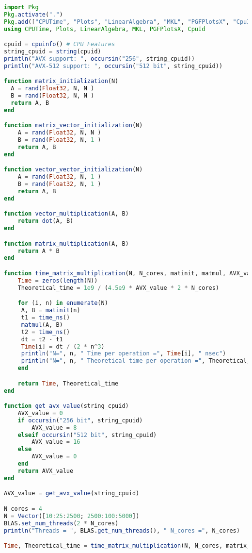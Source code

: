 \begin{lstlisting}[language=Julia]
import Pkg
Pkg.activate(".")
Pkg.add(["CPUTime", "Plots", "LinearAlgebra", "MKL", "PGFPlotsX", "CpuId"])
using CPUTime, Plots, LinearAlgebra, MKL, PGFPlotsX, CpuId

cpuid = cpuinfo() # CPU Features
string_cpuid = string(cpuid)
println("AVX support: ", occursin("256", string_cpuid))
println("AVX-512 support: ", occursin("512 bit", string_cpuid))

function matrix_initialization(N) 
  A = rand(Float32, N, N )
  B = rand(Float32, N, N )
  return A, B 
end 

function matrix_vector_initialization(N)
    A = rand(Float32, N, N )
    B = rand(Float32, N, 1 )
    return A, B 
end 

function vector_vector_initialization(N)
    A = rand(Float32, N, 1 )
    B = rand(Float32, N, 1 )
    return A, B 
end 

function vector_multiplication(A, B)
    return dot(A, B)  
end

function matrix_multiplication(A, B)
    return A * B  
end

function time_matrix_multiplication(N, N_cores, matinit, matmul, AVX_value)
    Time = zeros(length(N))
    Theoretical_time = 1e9 / (4.5e9 * AVX_value * 2 * N_cores)

    for (i, n) in enumerate(N)  
     A, B = matinit(n)
     t1 = time_ns()
     matmul(A, B)
     t2 = time_ns()
     dt = t2 - t1
     Time[i] = dt / (2 * n^3)
     println("N=", n, " Time per operation =", Time[i], " nsec")
     println("N=", n, " Theoretical time per operation =", Theoretical_time, " nsec")
    end 

    return Time, Theoretical_time
end

function get_avx_value(string_cpuid)
    AVX_value = 0
    if occursin("256 bit", string_cpuid)
        AVX_value = 8
    elseif occursin("512 bit", string_cpuid)
        AVX_value = 16
    else
        AVX_value = 0
    end
    return AVX_value
end

AVX_value = get_avx_value(string_cpuid)

N_cores = 4
N = Vector([10:25:2500; 2500:100:5000])
BLAS.set_num_threads(2 * N_cores)
println("Threads = ", BLAS.get_num_threads(), " N_cores =", N_cores)

Time, Theoretical_time = time_matrix_multiplication(N, N_cores, matrix_initialization, matrix_multiplication, AVX_value)
\end{lstlisting}

